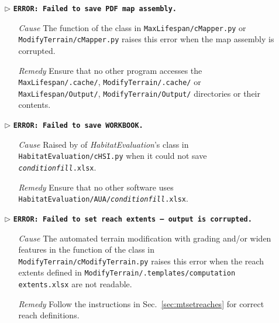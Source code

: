 \begin{itemize}
	\item[$\triangleright$]\textbf{\texttt{ERROR: Failed to save PDF map assembly.}}
	\begin{itemize}
		\item[\textit{Cause}\hspace{0.27cm}] The  function of the  class in \texttt{MaxLifespan/cMapper.py} or \texttt{ModifyTerrain/cMapper.py} raises this error when the map assembly is corrupted.
		\item[\textit{Remedy}] Ensure that no other program accesses the \texttt{MaxLifespan/.cache/}, \texttt{ModifyTerrain/.cache/} or \texttt{MaxLifespan/Output/}, \texttt{ModifyTerrain/Output/} directories or their contents.\\
	\end{itemize}
	
	\item[$\triangleright$]\textbf{\texttt{ERROR: Failed to save WORKBOOK.}}
	\begin{itemize}
		\item[\textit{Cause}\hspace{0.27cm}] Raised by  of \textit{HabitatEvaluation}'s  class in \texttt{HabitatEvaluation/cHSI.py} when it could not save \texttt{\textit{condition}{\myUnderscore}\textit{fill}.xlsx}.
		\item[\textit{Remedy}] Ensure that no other software uses \texttt{HabitatEvaluation/AUA/\texttt{\textit{condition}{\myUnderscore}\textit{fill}.xlsx}}.\\
	\end{itemize}
	
	\item[$\triangleright$]\textbf{\texttt{ERROR: Failed to set reach extents -- output is corrupted.}}
	\begin{itemize}
		\item[\textit{Cause}\hspace{0.27cm}] The automated terrain modification with grading and/or widen features in the  function of the  class in \texttt{ModifyTerrain/cModifyTerrain.py} raises this error when the reach extents defined in \texttt{ModifyTerrain/.templates/computation {\myUnderscore}extents.xlsx} are not readable.
		\item[\textit{Remedy}] Follow the instructions in Sec.~\ref{sec:mtsetreaches} for correct reach definitions.\\
	\end{itemize}
	

\end{itemize}
